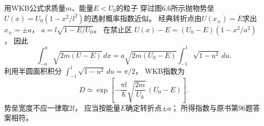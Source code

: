 用WKB公式求质量$m$、能量$E<U_0$的粒子
穿过图6.6所示抛物势垒
$U(x)=U_0(1-x^2/l^2)$的透射概率指数近似。
\exsolution
经典转折点由$U(x_\pm)=E$求出
$x_\pm=\pm a$，
$a=l\sqrt{1-E/U_0}$。
在禁止区
$U(x)-E=(U_0-E)(1-x^2/a^2)$，
因此
\[
 \int_{-a}^{a}\sqrt{2m(U-E)}\,dx
 =a\sqrt{2m(U_0-E)}
 \int_{-1}^{1}\sqrt{1-u^2}\,du.
\]
利用半圆面积积分
$\int_{-1}^{1}\sqrt{1-u^2}\,du=\pi/2$，
WKB指数为
\[
 \boxed{D\simeq
 \exp\!\left[-\frac{\pi l}{\hbar}
 \sqrt{\frac{2m}{U_0}}\,(U_0-E)\right]}.
\]
\excheck 势垒宽度不应一律取$2l$，
应当按能量$E$确定转折点$\pm a$；
所得指数与原书第96题答案相符。

